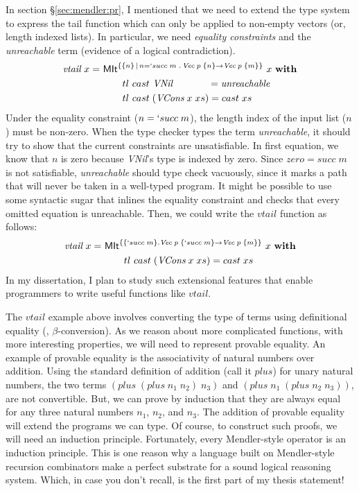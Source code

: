 In section \S\ref{sec:mendler:pr}, I mentioned that we 
need to extend the type system to express the tail function which can only 
be applied to non-empty vectors (or, length indexed lists).
In particular, we need \emph{equality constraints} and
the \emph{unreachable} term (evidence of a logical contradiction).
\begin{align*}
\textit{vtail}~x =~& \textsf{MIt}^{\{\{n\} \,|\, n=`succ\;m \; . \, \textit{Vec}\;p\;\{n\} -> \textit{Vec}\;p\;\{m\}\}}~x~\textbf{with}\\
&\qquad  tl ~cast~\textit{VNil}~~~~~~~~~~~ = \textit{unreachable} \\
&\qquad  tl ~cast\;(\textit{VCons}\;x\;xs) = cast\;xs
\end{align*}
Under the equality constraint ($n=`succ\;m$), the length index of
the input list ($n$) must be non-zero. When the type checker types
the term \textit{unreachable}, it should try to show that the current
constraints are unsatisfiable. In first equation, we know that $n$ is zero
because \textit{VNil}'s type is indexed by zero. Since $zero=succ\;m$ is not
satisfiable, \textit{unreachable} should type check vacuously, since it marks
a path that will never be taken in a well-typed program. It might be possible
to use some syntactic sugar that inlines the equality constraint and
checks that every omitted equation is unreachable. Then, we could write
the $vtail$ function as follows:
\begin{align*}
\textit{vtail}~x =~& \textsf{MIt}^{\{ \{`succ\;m\}. \textit{Vec}\;p\;\{`succ\;m\} -> \textit{Vec}\;p\;\{m\}\}}~x~\textbf{with}\\
&\qquad  tl ~cast\;(\textit{VCons}\;x\;xs) = cast\;xs
\end{align*}
In my dissertation, I plan to study such extensional features that enable
programmers to write useful functions like $vtail$.

The $vtail$ example above involves converting the type of terms using
definitional equality (\ie, $\beta$-conversion). As we reason about more
complicated functions, with more interesting properties, we will need to
represent provable equality. An example of provable equality is
the associativity of natural numbers over addition. Using the standard
definition of addition (call it $plus$) for unary natural numbers, the two terms
$(plus\;(plus\;n_1\;n_2)\;n_3)$ and $(plus\;n_1\;(plus\;n_2\;n_3))$,
are not convertible. But, we can prove by induction that they are always equal
for any three natural numbers $n_1$, $n_2$, and $n_3$. The addition of
provable equality will extend the programs we can type. Of course,
to construct such proofs, we will need an induction principle. Fortunately,
every Mendler-style operator is an induction principle. This is one reason
why a language built on Mendler-style recursion combinators make a perfect
substrate for a sound logical reasoning system. Which, in case you don't recall,
is the first part of my thesis statement!

